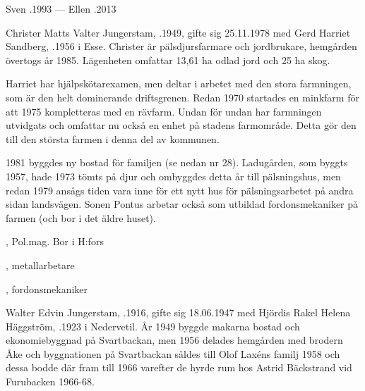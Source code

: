 Sven .1993  ---  Ellen .2013




Christer Matts Valter Jungerstam, .1949, gifte sig 25.11.1978 med Gerd Harriet Sandberg, .1956 i Esse. Christer är pälsdjursfarmare och jordbrukare, hemgården övertogs år 1985. Lägenheten omfattar 13,61 ha odlad jord och 25 ha skog.

Harriet har hjälpskötarexamen, men deltar i arbetet med den stora farmningen, som är den helt dominerande driftsgrenen. Redan 1970 startades en minkfarm för att 1975 kompletteras med en rävfarm. Undan för undan har farmningen utvidgats och omfattar nu också en enhet på stadens farmområde. Detta gör den till den största farmen i denna del av kommunen.


1981 byggdes ny bostad för familjen (se nedan nr 28). Ladugården, som byggts 1957, hade 1973 tömts på djur och ombyggdes detta år till pälsningshus, men redan 1979 ansågs tiden vara inne för ett nytt hus för pälsningsarbetet på andra sidan landsvägen. Sonen Pontus arbetar också som utbildad fordonsmekaniker på farmen (och bor i det äldre huset).
\begin{jhchildren}
  \item {}, Pol.mag. Bor i H:fors
  \item {}, metallarbetare
  \item {}, fordonsmekaniker
\end{jhchildren}


Walter Edvin Jungerstam, .1916, gifte sig 18.06.1947 med Hjördis Rakel Helena Häggström, .1923 i Nedervetil. År 1949 byggde makarna bostad och ekonomiebyggnad på Svartbackan, men 1956 delades hemgården med brodern Åke och byggnationen på Svartbackan såldes till Olof Laxéns familj 1958 och dessa bodde där fram till 1966 varefter de hyrde rum hos Astrid Bäckstrand vid Furubacken 1966-68.

